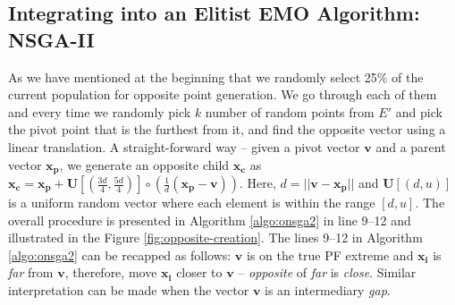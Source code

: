 \documentclass[journal]{IEEEtran}
\begin{document}
\subsection{Integrating into an Elitist EMO Algorithm: NSGA-II}
\label{sec:onsga2r}
As we have mentioned at the beginning that we randomly select 25\% of the current population for opposite point generation. We go through each of them and every time we randomly pick \(k\) number of random points from \(E'\) and pick the pivot point that is the furthest from it, and find the opposite vector using a linear translation. A straight-forward way -- given a pivot vector \(\mathbf{v}\) and a parent vector \(\mathbf{x_p}\), we generate an opposite child \(\mathbf{x_c}\) as \(\mathbf{x_c} = \mathbf{x_p} + \mathbf{U}[(\frac{3d}{4}, \frac{5d}{4})] \circ (\frac{1}{d}(\mathbf{x_p} - \mathbf{v}))\). Here, \(d = ||\mathbf{v} - \mathbf{x_p}||\) and \(\mathbf{U}[(d,u)]\) is a uniform random vector where each element is within the range \([d,u]\). The overall procedure is presented in Algorithm \ref{algo:onsga2} in line 9--12 and illustrated in the Figure \ref{fig:opposite-creation}. The lines 9--12 in Algorithm \ref{algo:onsga2} can be recapped as follows: \(\mathbf{v}\) is on the true PF extreme and \(\mathbf{x_i}\) is \textit{far} from \(\mathbf{v}\), therefore, move \(\mathbf{x_i}\) closer to \(\mathbf{v}\) -- \textit{opposite} of \textit{far} is \textit{close}. Similar interpretation can be made when the vector \(\mathbf{v}\) is an intermediary \textit{gap}. 
\end{document}
